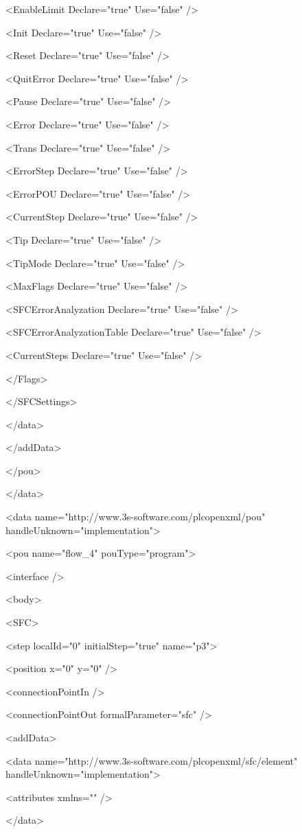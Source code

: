    <EnableLimit Declare="true" Use="false" />

   <Init Declare="true" Use="false" />

   <Reset Declare="true" Use="false" />

   <QuitError Declare="true" Use="false" />

   <Pause Declare="true" Use="false" />

   <Error Declare="true" Use="false" />

   <Trans Declare="true" Use="false" />

   <ErrorStep Declare="true" Use="false" />

   <ErrorPOU Declare="true" Use="false" />

   <CurrentStep Declare="true" Use="false" />

   <Tip Declare="true" Use="false" />

   <TipMode Declare="true" Use="false" />

   <MaxFlags Declare="true" Use="false" />

   <SFCErrorAnalyzation Declare="true" Use="false" />

   <SFCErrorAnalyzationTable Declare="true" Use="false" />

   <CurrentSteps Declare="true" Use="false" />

  </Flags>

 </SFCSettings>

</data>

</addData>

</pou>

</data>

<data name="http://www.3s-software.com/plcopenxml/pou" handleUnknown="implementation">

<pou name="flow\_4" pouType="program">

<interface />

<body>

<SFC>

 <step localId="0" initialStep="true" name="p3">

  <position x="0" y="0" />

  <connectionPointIn />

  <connectionPointOut formalParameter="sfc" />

  <addData>

   <data name="http://www.3s-software.com/plcopenxml/sfc/element" handleUnknown="implementation">

    <attributes xmlns="" />

   </data>

